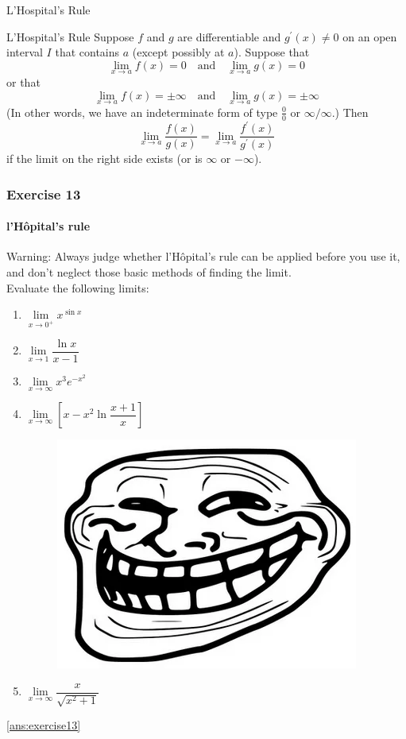 \begin{frame}{L'Hospital's Rule}
	\begin{block}{L'Hospital's Rule}
		Suppose $f$ and $g$ are differentiable and $g^\prime(x)\neq0$ on an open interval $I$ that contains $a$ (except possibly at $a$). Suppose that\\
		$$
			\lim_{x\rightarrow a}f(x)=0\quad \text{and}\quad \lim_{x\rightarrow a}g(x)=0
		$$
		or that
		$$
			\lim_{x\rightarrow a}f(x)=\pm\infty\quad \text{and}\quad \lim_{x\rightarrow a}g(x)=\pm\infty
		$$
		(In other words, we have an indeterminate form of type $\frac{0}{0}$ or $\infty/\infty$.) Then\\
		$$
			\lim_{x\rightarrow a}\frac{f(x)}{g(x)}=\lim_{x\rightarrow a}\frac{f^\prime(x)}{g^\prime(x)}
		$$
		if the limit on the right side exists (or is $\infty$ or $-\infty$).
	\end{block}
\end{frame}






\begin{frame}
	\frametitle{Exercise 13}
	\framesubtitle{l'Hôpital's rule}
	\alert{Warning}: Always judge whether l'Hôpital's rule can be applied before you use it, and \alert{don't neglect those basic methods of finding the limit}.\\
	\bigskip
	Evaluate the following limits:
	\begin{enumerate}
		\item $\lim\limits_{\textit{x} \to 0^{+}}x^{\sin{x}}$
		\item $\lim\limits_{\textit{x} \to 1}\dfrac{\ln x}{x-1}$
		\item $\lim\limits_{\textit{x} \to \infty}x^{3}e^{-x^{2}}$
		\item $\lim\limits_{\textit{x} \to \infty}[x - x^{2}\ln{\dfrac{x + 1}{x}}]$\\
		      \begin{figure}
			      \includegraphics[width=0.1\linewidth]{res/troll.png}
		      \end{figure}
		\item \begin{center}
			      $\lim\limits_{\textit{x} \to \infty}\dfrac{x}{\sqrt{x^{2} + 1}}$
		      \end{center}
	\end{enumerate}
	\ref{ans:exercise13}
\end{frame}


